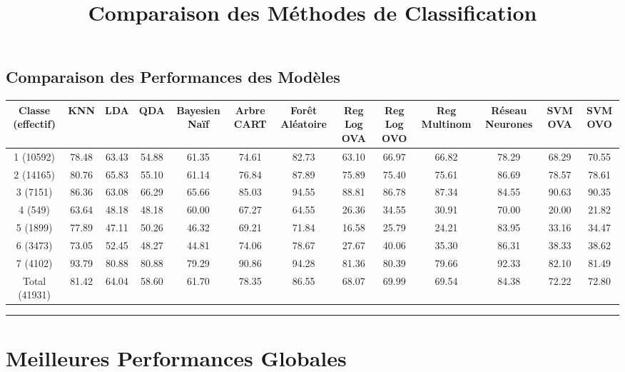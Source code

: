 \documentclass[
]{article}
\title{Comparaison des Méthodes de Classification}
\author{}
\date{}
\begin{document}
\maketitle


\subsection{Comparaison des Performances des
Modèles}\label{comparaison-des-performances-des-moduxe8les}

\begin{adjustbox}{max width=\textwidth}
\begin{tabular}{|c|c|c|c|c|c|c|c|c|c|c|c|c|}
\hline
Classe (effectif) & KNN & LDA & QDA & Bayesien Naïf & Arbre CART & Forêt Aléatoire & Reg Log OVA & Reg Log OVO & Reg Multinom & Réseau Neurones & SVM OVA & SVM OVO \\
\hline
1 (10592) & 78.48 & 63.43 & 54.88 & 61.35 & 74.61 & 82.73 & 63.10 & 66.97 & 66.82 & 78.29 & 68.29 & 70.55 \\
2 (14165) & 80.76 & 65.83 & 55.10 & 61.14 & 76.84 & 87.89 & 75.89 & 75.40 & 75.61 & 86.69 & 78.57 & 78.61 \\
3 (7151) & 86.36 & 63.08 & 66.29 & 65.66 & 85.03 & 94.55 & 88.81 & 86.78 & 87.34 & 84.55 & 90.63 & 90.35 \\
4 (549) & 63.64 & 48.18 & 48.18 & 60.00 & 67.27 & 64.55 & 26.36 & 34.55 & 30.91 & 70.00 & 20.00 & 21.82 \\
5 (1899) & 77.89 & 47.11 & 50.26 & 46.32 & 69.21 & 71.84 & 16.58 & 25.79 & 24.21 & 83.95 & 33.16 & 34.47 \\
6 (3473) & 73.05 & 52.45 & 48.27 & 44.81 & 74.06 & 78.67 & 27.67 & 40.06 & 35.30 & 86.31 & 38.33 & 38.62 \\
7 (4102) & 93.79 & 80.88 & 80.88 & 79.29 & 90.86 & 94.28 & 81.36 & 80.39 & 79.66 & 92.33 & 82.10 & 81.49 \\
Total (41931) & 81.42 & 64.04 & 58.60 & 61.70 & 78.35 & 86.55 & 68.07 & 69.99 & 69.54 & 84.38 & 72.22 & 72.80 \\
\hline
\end{tabular}
\end{adjustbox}

\begin{center}\rule{0.5\linewidth}{0.5pt}\end{center}

\section{Meilleures Performances
Globales}\label{meilleures-performances-globales}
\end{document}
